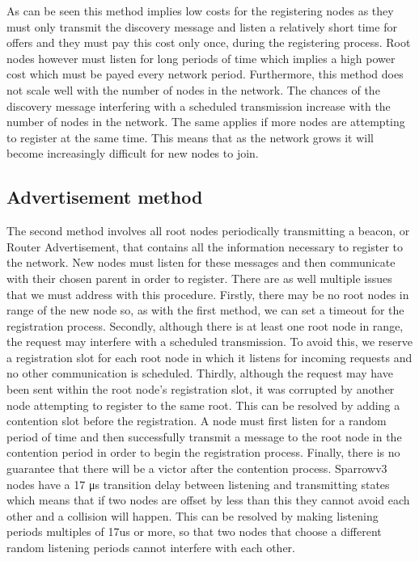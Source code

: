 As can be seen this method implies low costs for the registering nodes as they
must only transmit the discovery message and listen a relatively short time for
offers and they must pay this cost only once, during the registering process.
Root nodes however must listen for long periods of time which implies a high
power cost which must be payed every network period. Furthermore, this method
does not scale well with the number of nodes in the network. The chances of the
discovery message interfering with a scheduled transmission increase with the
number of nodes in the network. The same applies if more nodes are attempting
to register at the same time. This means that as the network grows it will
become increasingly difficult for new nodes to join.

\subsection{Advertisement method}
\label{subsec:advertisement_method}

The second method involves all root nodes periodically transmitting a beacon,
or Router Advertisement, that contains all the information necessary to
register to the network. New nodes must listen for these messages and then
communicate with their chosen parent in order to register.  There are as well
multiple issues that we must address with this procedure. Firstly, there may be
no root nodes in range of the new node so, as with the first method, we can set
a timeout for the registration process. Secondly, although there is at least
one root node in range, the request may interfere with a scheduled
transmission. To avoid this, we reserve a registration slot for each root node
in which it listens for incoming requests and no other communication is
scheduled. Thirdly, although the request may have been sent within the root
node's registration slot, it was corrupted by another node attempting to
register to the same root. This can be resolved by adding a contention slot
before the registration. A node must first listen for a random period of time
and then successfully transmit a message to the root node in the contention
period in order to begin the registration process. Finally, there is no
guarantee that there will be a victor after the contention process. Sparrowv3
nodes have a 17 μs transition delay between listening and transmitting states
which means that if two nodes are offset by less than this they cannot avoid
each other and a collision will happen. This can be resolved by making
listening periods multiples of 17us or more, so that two nodes that choose a
different random listening periods cannot interfere with each other.

